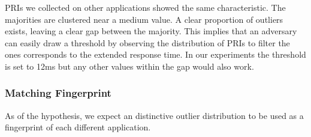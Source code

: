 PRIs we collected on other applications showed the same characteristic. The majorities are clustered near a medium value. A clear proportion of outliers exists, leaving a clear gap between the majority. This implies that an adversary can easily draw a threshold by observing the distribution of PRIs to filter the ones corresponds to the extended response time. In our experiments the threshold is set to 12ms but any other values within the gap would also work.

\subsubsection{Matching Fingerprint}

As of the hypothesis, we expect an distinctive outlier distribution to be used as a fingerprint of each different application. 
